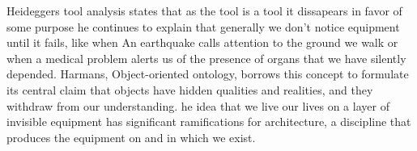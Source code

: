 Heideggers tool analysis states that as the tool is a tool it dissapears in favor of some purpose he continues to explain that generally we don't notice equipment until it fails, like when An earthquake calls attention to the ground we walk or when a medical problem alerts us of the presence of organs that we have silently depended\cite{Harman2011}.
Harmans, Object-oriented ontology, borrows this concept to formulate its central claim that objects have hidden qualities and realities, and they withdraw from our understanding.\cite{Gage2015}
he idea that we live our lives on a layer of invisible equipment has significant ramifications for architecture, a discipline that produces the equipment on and in which we exist.\cite{Gage2015}





